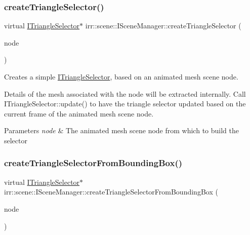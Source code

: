 \subsubsection{\texorpdfstring{create\+Triangle\+Selector()}{createTriangleSelector()}\hspace{0.1cm}{\footnotesize\ttfamily [2/2]}}
{\footnotesize\ttfamily virtual \hyperlink{classirr_1_1scene_1_1ITriangleSelector}{I\+Triangle\+Selector}$\ast$ irr\+::scene\+::\+I\+Scene\+Manager\+::create\+Triangle\+Selector (\begin{DoxyParamCaption}\item[{\hyperlink{classirr_1_1scene_1_1IAnimatedMeshSceneNode}{I\+Animated\+Mesh\+Scene\+Node} $\ast$}]{node }\end{DoxyParamCaption})\hspace{0.3cm}{\ttfamily [pure virtual]}}



Creates a simple \hyperlink{classirr_1_1scene_1_1ITriangleSelector}{I\+Triangle\+Selector}, based on an animated mesh scene node. 

Details of the mesh associated with the node will be extracted internally. Call I\+Triangle\+Selector\+::update() to have the triangle selector updated based on the current frame of the animated mesh scene node. 
\begin{DoxyParams}{Parameters}
{\em node} & The animated mesh scene node from which to build the selector \\
\hline
\end{DoxyParams}
\mbox{\label{classirr_1_1scene_1_1ISceneManager_adb717113b4203e92f2bd95c84488059c}} 
\subsubsection{\texorpdfstring{create\+Triangle\+Selector\+From\+Bounding\+Box()}{createTriangleSelectorFromBoundingBox()}}
{\footnotesize\ttfamily virtual \hyperlink{classirr_1_1scene_1_1ITriangleSelector}{I\+Triangle\+Selector}$\ast$ irr\+::scene\+::\+I\+Scene\+Manager\+::create\+Triangle\+Selector\+From\+Bounding\+Box (\begin{DoxyParamCaption}\item[{\hyperlink{classirr_1_1scene_1_1ISceneNode}{I\+Scene\+Node} $\ast$}]{node }\end{DoxyParamCaption})\hspace{0.3cm}{\ttfamily [pure virtual]}}



